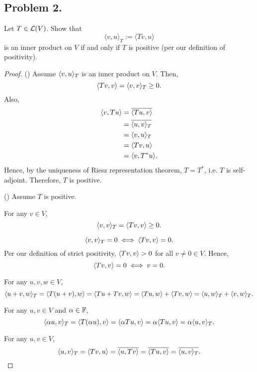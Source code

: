 \documentclass{article}
\begin{document}
\subsection*{Problem 2.}
Let $T \in {\cal L}(V)$. Show that
$$\langle v,u\rangle_T := \langle Tv,u\rangle $$
is an inner product on $V$ if and only if $T$ is positive (per our definition of positivity).
\begin{proof}
    (\implies) Assume $\langle v,u\rangle_T$ is an inner product on $V$. Then, 
    \[
      \langle Tv,v\rangle = \langle v,v\rangle_T \ge 0.
    \]
    Also,
    \begin{align*}
        \langle v,Tu\rangle & = \overline{\langle Tu, v\rangle} \\
        & = \overline{\langle u,v\rangle_T} \\
        & = \langle v,u\rangle_T \\
        & = \langle Tv, u\rangle \\
        & = \langle v, T^*u\rangle.
    \end{align*}
    Hence, by the uniqueness of Riesz representation theorem, $T = T^*$, i.e. $T$ is self-adjoint.
    Therefore, $T$ is positive.

    (\impliedby) Assume $T$ is positive. 

     For any $v\in V$, 
    \[
        \langle v,v\rangle_T = \langle Tv, v\rangle \ge 0.
    \]

    \[
        \langle v,v\rangle_T = 0 \iff \langle Tv, v\rangle = 0.
    \]
    Per our definition of strict positivity, $\langle Tv, v\rangle> 0$ for all $v\neq 0\in V$.
    Hence, 
    \[
        \langle Tv, v\rangle = 0 \iff v=0.
    \]

     For any $u,v,w\in V$,
    \[
      \langle u+v,w\rangle_T = \langle T(u+v), w\rangle = \langle Tu + Tv, w\rangle = \langle Tu, w\rangle + \langle Tv, w\rangle =
        \langle u,w\rangle_T + \langle v,w\rangle_T.
    \]

     For any $u,v\in V$ and $\alpha\in \mathbb{F}$,
    \[
        \langle\alpha u, v\rangle_T = \langle T(\alpha u), v\rangle = \langle\alpha Tu, v\rangle = \alpha \langle Tu, v\rangle =
        \alpha \langle u,v\rangle_T.
    \]

     For any $u,v\in V$,
    \[
        \langle u,v\rangle_T = \langle Tv, u\rangle = \overline{\langle u, Tv\rangle} = \overline{\langle Tu, v\rangle}
        = \overline{\langle u,v\rangle_T}.
    \]
\end{proof}

\newpage
\end{document}
